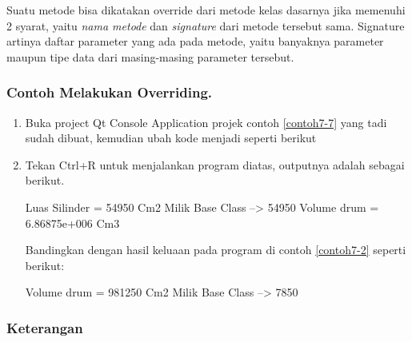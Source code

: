 Suatu metode bisa dikatakan override dari metode kelas dasarnya jika
memenuhi 2 syarat, yaitu \emph{nama metode} dan \emph{signature} dari
metode tersebut sama. Signature artinya daftar parameter yang ada pada
metode, yaitu banyaknya parameter maupun tipe data dari masing-masing
parameter tersebut.

\subsubsection*{Contoh Melakukan Overriding.}
\begin{enumerate}
	
	
	\item Buka project Qt Console Application projek contoh \ref{contoh7-7} yang tadi sudah
	dibuat, kemudian ubah kode menjadi seperti berikut
	


\item Tekan Ctrl+R untuk menjalankan program diatas, outputnya adalah
		sebagai berikut.

	
	\begin{lcverbatim}
Luas Silinder = 54950 Cm2
Milik Base Class --> 54950
Volume drum = 6.86875e+006 Cm3
	\end{lcverbatim}
	
	Bandingkan dengan hasil keluaan pada program di contoh \ref{contoh7-2} 
  seperti berikut:
	
	\begin{lcverbatim}
Volume drum = 981250 Cm2
Milik Base Class –> 7850
	\end{lcverbatim}
\end{enumerate}


\subsubsection*{Keterangan}

